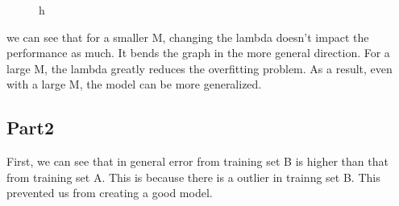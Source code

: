 \begin{figure}[!htb]
\end{figure}



\begin{figure}{h}
\end{figure}





we can see that for a smaller M, changing the lambda doesn't impact the performance as much. It bends the graph in the more general direction. For a large M, the lambda greatly reduces the overfitting problem. As a result, even with a large M, the model can be more generalized. 

\subsection{Part2}





First, we can see that in general error from training set B is higher than that from training set A. 
This is because there is a outlier in trainng set B. This prevented us from creating a good model. 



